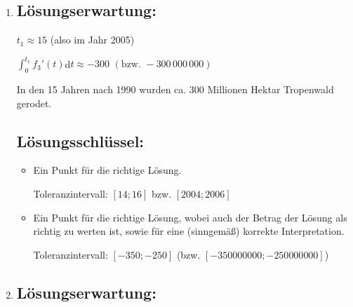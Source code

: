 \begin{langesbeispiel}
{\begin{enumerate}
	Entsprechend diesem Modell würde der Tropenwald im Laufe des Jahres 2037 verschwinden.
	
	\subsection{Lösungsschlüssel:}
	
\begin{itemize}
	\item Ein Punkt für eine korrekte Funktionsgleichung.  
	\item Ein Punkt für die Angabe einer korrekten Jahreszahl sowie eines korrekten Graphen, wobei dieser als Gerade erkennbar sein muss, die durch $(0|800)$ verläuft und deren Schnittpunkt mit der Zeitachse im Toleranzintervall $[45; 50]$ liegt. 
	
	Toleranzintervall für das gesuchte Jahr: $[2035; 2040]$
\end{itemize}

\item \subsection{Lösungserwartung:}
	
	$t_1\approx 15$ (also im Jahr 2005)\leer
	
	$\int^{t_1}_0{f_3'(t)}$d$t\approx -300$ $(\text{bzw. }-300\,000\,000)$
	
	In den 15 Jahren nach 1990 wurden ca. 300 Millionen Hektar Tropenwald gerodet.	
	\subsection{Lösungsschlüssel:}
	
\begin{itemize}
	\item Ein Punkt für die richtige Lösung. 
	
	Toleranzintervall: $[14; 16]$ bzw. $[2004; 2006]$
	\item Ein Punkt für die richtige Lösung, wobei auch der Betrag der Lösung als richtig zu werten ist, sowie für eine (sinngemäß) korrekte Interpretation. 
	
	Toleranzintervall: $[-350; -250]$ (bzw. $[-350 000 000; -250 000 000]$)
\end{itemize}

\item \subsection{Lösungserwartung:}
	

\end{enumerate}}
\end{langesbeispiel}
